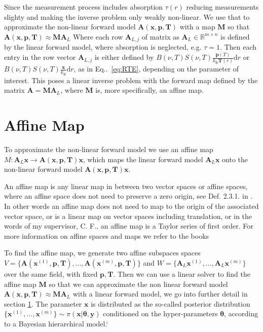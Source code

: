 Since the measurement process includes absorption $\tau(r)$ reducing measurements slighty and making the inverse problem only weakly non-linear. 
We use that to approximate the non-linear forward model $\bm{A}(\bm{x},  \bm{p},\bm{T})$ with a map $\bm{M}$ so that $\bm{A}(\bm{x},  \bm{p},\bm{T}) \approx \bm{M} \bm{A}_L $
Where each row $\bm{A}_{L,j} $ of matrix as $\bm{A}_L \in \mathbb{R}^{m \times n}$ is defined by the linear forward model, where absorption is neglected, e.g. $\tau = 1$. 
Then each entry in the row vector $\bm{A}_{L,j} $ is either defined by $ B(\nu,T) S(\nu, T)   \frac{\bm{p}(T)}{k_{\text{B}} \bm{T}(r)}  \text{d}r$ or $B(\nu,T) S(\nu, T)   \frac{\bm{x}}{k_{\text{B}}}  \text{d}r$, as in Eq..~\eqref{eq:RTE}, depending on the parameter of interest.
This poses a linear inverse problem with the forward map defined by the matrix $\bm{A} = \bm{M} \bm{A}_L$, where $\bm{M}$ is, more specifically, an affine map.


\section{Affine Map}

To approximate the non-linear forward model we use an affine map $ M:\bm{A}_L \bm{x} \rightarrow \bm{A}(\bm{x},  \bm{p},\bm{T}) \bm{x}$, which maps the linear forward model $\bm{A}_L \bm{x}$ onto the non-linear forward model $\bm{A}(\bm{x},  \bm{p},\bm{T}) \bm{x}$.


An affine map is any linear map in between two vector spaces or affine spaces, where an affine space does not need to preserve a zero origin, see Def. 2.3.1. in \cite{berger2009geometry}.
In other words an affine map does not need to map to the origin of the associated vector space, or is a linear map on vector spaces including translation, or in the words of my supervisor, C. F., an affine map is a Taylor series of first order.
For more information on affine spaces and maps we refer to the books \cite{berger2009geometry, katsumi1994affine}

To find the affine map, we generate two affine subspaces spaces \newline $V = \big\{ \bm{A}(\bm{x}^{(1)}, \bm{p,T}), \dots ,\bm{A}(\bm{x}^{(m)}, \bm{p,T})\big\} $ and $W = \big\{ \bm{A}_L\bm{x}^{(1)}, \dots ,\bm{A}_L\bm{x}^{(m)}\big\}$ over the same field, with fixed $\bm{p,T}$.
Then we can use a linear solver to find the affine map $\bm{M}$ so that we can approximate the non linear forward model $\bm{A}(\bm{x},  \bm{p},\bm{T}) \approx \bm{M} \bm{A}_L$ with a linear forward model, we go into further detail in section \ref{}.
The parameter $\bm{x}$ is distributed as the so-called posterior distribution $\big\{  \bm{x}^{(1)} , \dots, \bm{x}^{(m)} \big\} \sim \pi(\bm{x}|\bm{\theta},\bm{y})$ conditioned on the hyper-parameters $\bm{\theta}$, according to a Bayesian hierarchical model.`


